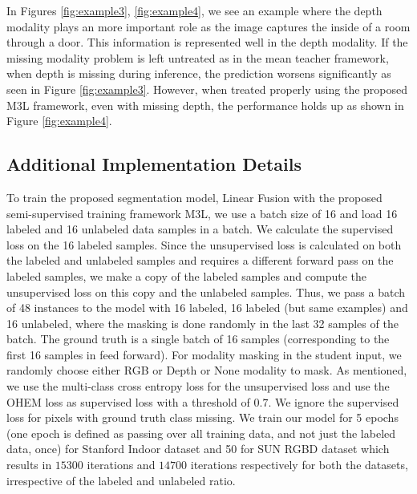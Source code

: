 \documentclass[10pt,twocolumn,letterpaper]{article}
\begin{document}
In Figures \ref{fig:example3}, \ref{fig:example4}, we see an example where the depth modality plays an more important role as the image captures the inside of a room through a door. This information is represented well in the depth modality. If the missing modality problem is left untreated as in the mean teacher \cite{mt} framework, when depth is missing during inference, the prediction worsens significantly as seen in Figure \ref{fig:example3}. However, when treated properly using the proposed M3L framework, even with missing depth, the performance holds up as shown in Figure \ref{fig:example4}. \subsection{Additional Implementation Details}
To train the proposed segmentation model, Linear Fusion with the proposed semi-supervised training framework M3L, we use a batch size of 16 and load 16 labeled and 16 unlabeled data samples in a batch. We calculate the supervised loss on the 16 labeled samples. Since the unsupervised loss is calculated on both the labeled and unlabeled samples and requires a different forward pass on the labeled samples, we make a copy of the labeled samples and compute the unsupervised loss on this copy and the unlabeled samples. Thus, we pass a batch of 48 instances to the model with 16 labeled, 16 labeled (but same examples) and 16 unlabeled, where the masking is done randomly in the last 32 samples of the batch. The ground truth is a single batch of 16 samples (corresponding to the first 16 samples in feed forward). 
For modality masking in the student input, we randomly choose either RGB or Depth or None modality to mask. As mentioned, we use the multi-class cross entropy loss for the unsupervised loss and use the OHEM loss \cite{ohem} as supervised loss with a threshold of $0.7$. We ignore the supervised loss for pixels with ground truth class missing. We train our model for 5 epochs (one epoch is defined as passing over all training data, and not just the labeled data, once) for Stanford Indoor dataset and 50 for SUN RGBD dataset which results in $15300$ iterations and $14700$ iterations respectively for both the datasets, irrespective of the labeled and unlabeled ratio.  
\end{document}
